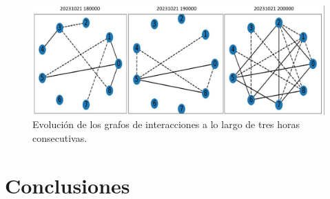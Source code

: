 \documentclass[a4paper,10pt,twocolumn]{article}
\begin{document}
\begin{figure}[h!]
    \centering
    \includegraphics[width=\columnwidth]{assets/3_graphs.jpg}
    \caption{Evolución de los grafos de interacciones a lo largo de tres horas consecutivas.}
    \label{fig:graph_evol}
\end{figure}




\section{Conclusiones}\label{sec:conc}

\end{document}
